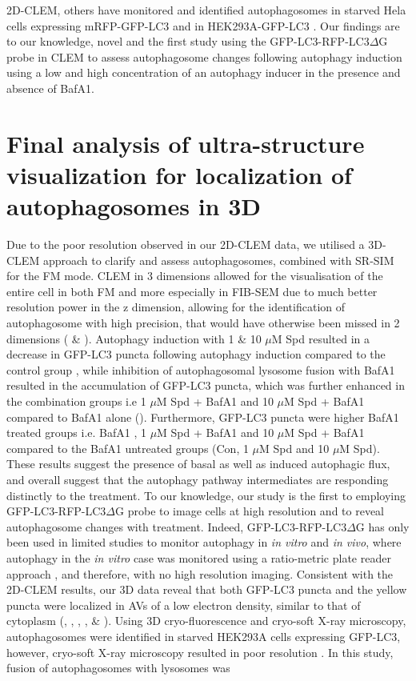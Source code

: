 2D-CLEM, others have monitored and identified autophagosomes in starved Hela cells expressing mRFP-GFP-LC3 \citep{Gudmundsson2019} and in HEK293A-GFP-LC3 \citep{Razi2009}. Our findings are to our knowledge, novel and the first study using the GFP-LC3-RFP-LC3$\Delta$G probe in CLEM to assess autophagosome changes following autophagy induction using a low and high concentration  of an autophagy inducer in the presence and absence of BafA1.

\section{Final analysis of ultra-structure visualization for localization of autophagosomes in 3D}
Due to the poor resolution observed in our 2D-CLEM data, we utilised a  3D-CLEM approach to clarify and assess autophagosomes, combined with SR-SIM for the FM mode. CLEM in 3 dimensions allowed for the visualisation of the entire cell in both FM and more especially in FIB-SEM due to much better resolution power in the z dimension, allowing for the identification of autophagosome with high precision, that would have otherwise been missed in 2 dimensions ( \& ). Autophagy induction with 1 \& 10 $\mu$M Spd resulted in a decrease in GFP-LC3 puncta following autophagy induction compared to the control group , while inhibition of autophagosomal lysosome fusion with BafA1 resulted in the accumulation of GFP-LC3 puncta, which was further enhanced in the combination groups i.e 1 $\mu$M Spd + BafA1 and 10 $\mu$M Spd + BafA1 compared to BafA1 alone (). Furthermore, GFP-LC3 puncta were higher BafA1 treated groups i.e. BafA1 , 1 $\mu$M Spd + BafA1 and 10 $\mu$M Spd + BafA1 compared to the BafA1 untreated groups (Con, 1 $\mu$M Spd and 10 $\mu$M Spd). These results suggest the presence of basal as well as induced autophagic flux, and overall suggest that the autophagy pathway intermediates are responding distinctly to the treatment. To our knowledge, our study is the first to employing GFP-LC3-RFP-LC3$\Delta$G probe to image cells at high resolution and to reveal autophagosome changes with treatment. Indeed, GFP-LC3-RFP-LC3$\Delta$G has only been used in limited studies to monitor autophagy in \textit{in vitro} and \textit{in vivo}, where autophagy in the \textit{in vitro} case was monitored using a ratio-metric plate reader approach \citep{Kaizuka2016}, and therefore, with no high resolution imaging. Consistent with the 2D-CLEM results, our 3D data reveal that both GFP-LC3 puncta and the yellow puncta were localized in AVs of a low electron density, similar to that of cytoplasm (, , , ,  \& ). Using 3D cryo-fluorescence and cryo-soft X-ray microscopy, autophagosomes were identified in starved HEK293A cells expressing GFP-LC3, however, cryo-soft X-ray microscopy resulted in poor resolution \citep{Duke2014}. In this study, fusion of autophagosomes with lysosomes was 
